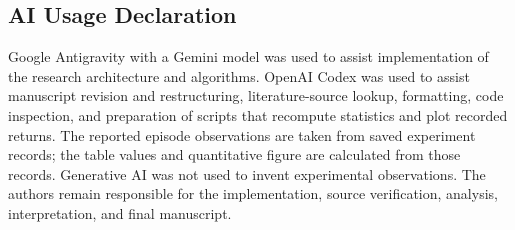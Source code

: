 \documentclass[runningheads]{llncs}
\begin{document}
\begin{samepage}
\section*{AI Usage Declaration}
Google Antigravity with a Gemini model was used to assist implementation of the research architecture and algorithms. OpenAI Codex was used to assist manuscript revision and restructuring, literature-source lookup, formatting, code inspection, and preparation of scripts that recompute statistics and plot recorded returns. The reported episode observations are taken from saved experiment records; the table values and quantitative figure are calculated from those records. Generative AI was not used to invent experimental observations. The authors remain responsible for the implementation, source verification, analysis, interpretation, and final manuscript.
\par\end{samepage}



\end{document}
